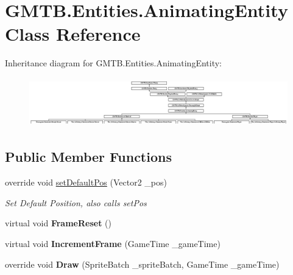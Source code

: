 \hypertarget{class_g_m_t_b_1_1_entities_1_1_animating_entity}{}\section{G\+M\+T\+B.\+Entities.\+Animating\+Entity Class Reference}
\label{class_g_m_t_b_1_1_entities_1_1_animating_entity}
Inheritance diagram for G\+M\+T\+B.\+Entities.\+Animating\+Entity\+:\begin{figure}[H]
\begin{center}
\leavevmode
\includegraphics[height=2.154882cm]{class_g_m_t_b_1_1_entities_1_1_animating_entity}
\end{center}
\end{figure}
\subsection*{Public Member Functions}
\begin{DoxyCompactItemize}
\item 
override void \mbox{\hyperlink{class_g_m_t_b_1_1_entities_1_1_animating_entity_a34e8160516927afb278915c3211b38c5}{set\+Default\+Pos}} (Vector2 \+\_\+pos)
\begin{DoxyCompactList}\small\item\em Set Default Position, also calls set\+Pos \end{DoxyCompactList}\item 
\mbox{\label{class_g_m_t_b_1_1_entities_1_1_animating_entity_aadacc68bdeaaff16beeffa15c0048f67}} 
virtual void {\bfseries Frame\+Reset} ()
\item 
\mbox{\label{class_g_m_t_b_1_1_entities_1_1_animating_entity_a4c2478a4d4ec6e049c0b7b229873f695}} 
virtual void {\bfseries Increment\+Frame} (Game\+Time \+\_\+game\+Time)
\item 
\mbox{\label{class_g_m_t_b_1_1_entities_1_1_animating_entity_a7fc33d113c663fb7bfe197e69a671a39}} 
override void {\bfseries Draw} (Sprite\+Batch \+\_\+sprite\+Batch, Game\+Time \+\_\+game\+Time)
\end{DoxyCompactItemize}
